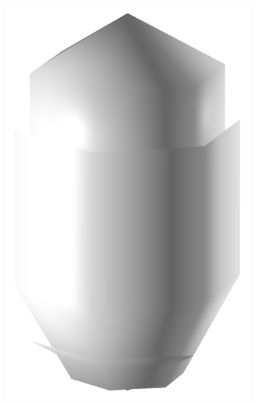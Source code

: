 \begin{figure}
\begin{center}
\begin{subfigure}{0.2\textwidth}
    \includegraphics[width=\linewidth]{assets/images/shapes/bugold/bad_mesh_low}
    \caption{}
    \end{subfigure}
    \begin{subfigure}{0.2\textwidth}

\end{subfigure}
\end{center}
\end{figure}
